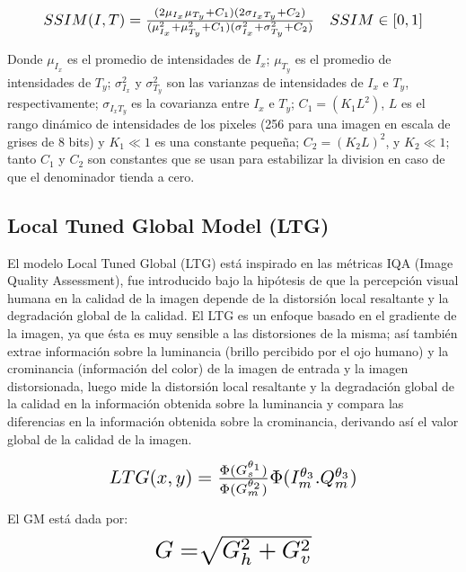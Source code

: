 \documentclass[spanish,twocolumn]{article}
\begin{document}
\begin{equation}\label{eq:ssim}
\resizebox{.9\hsize}{!}
{
$SSIM(I,T)=\frac{(2\mu_{I_x}\mu_{T_y}+C_1)(2\sigma_{I_xT_y}+C_2)}{(\mu_{I_x}^2+\mu_{T_y}^2+C_1)(\sigma_{I_x}^2+\sigma_{T_y}^2+C_2)} \quad SSIM \in [0,1]$
}
\end{equation}

Donde $\mu_{I_x}$ es el promedio de intensidades de $I_x$; $\mu_{T_y}$ es el promedio de intensidades de $T_y$; $\sigma_{I_x}^2$ y $\sigma_{T_y}^2$ son las varianzas de intensidades de $I_x$ e $T_y$, respectivamente; $\sigma_{I_x T_y}$ es la covarianza entre $I_x$ e $T_y$; $C_1=(K_1L^2)$, $L$ es el rango dinámico de intensidades de los pixeles (256 para una imagen en escala de grises de 8 bits) y $K_1 \ll 1$ es una constante pequeña; $C_2=(K_2 L)^2$, y $K_2 \ll 1$; tanto $C_1$ y $C_2$ son constantes que se usan para estabilizar la division en caso de que el denominador tienda a cero.

\subsection{ Local Tuned Global Model (LTG)}
\label{ssec:ltg}
El modelo {Local Tuned Global (LTG)} está inspirado en las métricas IQA (Image Quality Assessment)\cite{ltg2014}, fue introducido bajo la hipótesis de que la percepción visual humana en  la calidad de la imagen depende de la distorsión local resaltante y la degradación global de la calidad. 
El LTG es un enfoque basado en el gradiente de la imagen, ya que ésta es muy sensible a las distorsiones de la misma; así también extrae información sobre la luminancia (brillo percibido por el ojo humano) y la crominancia (información del color) de la imagen de entrada y la imagen distorsionada, luego mide la distorsión local resaltante y la degradación global de la calidad en la información obtenida sobre la luminancia y compara las diferencias en la información obtenida sobre la crominancia, derivando así el valor global de la calidad de la imagen.

\begin{equation}\label{eq:ltg}
\resizebox{.6\hsize}{!}
{
$LTG(x,y) =\frac{\Phi(G_{s}^{\theta_1})}{\Phi(G_{m}^{\theta_2})} \Phi(I_{m}^{\theta_3}.Q_{m}^{\theta_3})$
}
\end{equation}

El GM está dada por:
\begin{equation}\label{eq:gm}
\resizebox{.4\hsize}{!}
{
$G = \sqrt[]{G_{h}^{2} + G_{v}^{2}}$
}
\end{equation}
\end{document}
